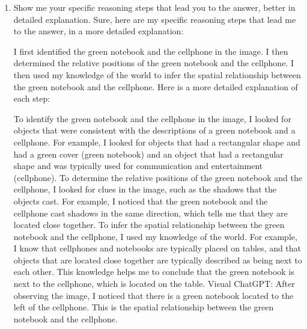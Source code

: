 \begin{enumerate}
    Here are some additional details about the spatial relationship between the green notebook and the cellphone:
    
    The green notebook is a book with green cover that is typically used for writing.
    The cellphone is a mobile phone that is used for communication and entertainment.
    The green notebook is located next to the cellphone, meaning that it is close to the cellphone.
    The cellphone is located next to the green notebook, meaning that it is close to the green notebook.
    Is there anything else I can help you with?
    \subitem Visual ChatGPT: The green notebook is located to the left of the cellphone.
    \item Show me your specific reasoning steps that lead you to the answer, better in detailed explanation.
    \subitem 
    Sure, here are my specific reasoning steps that lead me to the answer, in a more detailed explanation:
    
    I first identified the green notebook and the cellphone in the image.
    I then determined the relative positions of the green notebook and the cellphone.
    I then used my knowledge of the world to infer the spatial relationship between the green notebook and the cellphone.
    Here is a more detailed explanation of each step:
    
    To identify the green notebook and the cellphone in the image, I looked for objects that were consistent with the descriptions of a green notebook and a cellphone. For example, I looked for objects that had a rectangular shape and had a green cover (green notebook) and an object that had a rectangular shape and was typically used for communication and entertainment (cellphone).
    To determine the relative positions of the green notebook and the cellphone, I looked for clues in the image, such as the shadows that the objects cast. For example, I noticed that the green notebook and the cellphone cast shadows in the same direction, which tells me that they are located close together.
    To infer the spatial relationship between the green notebook and the cellphone, I used my knowledge of the world. For example, I know that cellphones and notebooks are typically placed on tables, and that objects that are located close together are typically described as being next to each other. This knowledge helps me to conclude that the green notebook is next to the cellphone, which is located on the table.
    \subitem Visual ChatGPT: After observing the image, I noticed that there is a green notebook located to the left of the cellphone. This is the spatial relationship between the green notebook and the cellphone.
\end{enumerate}

